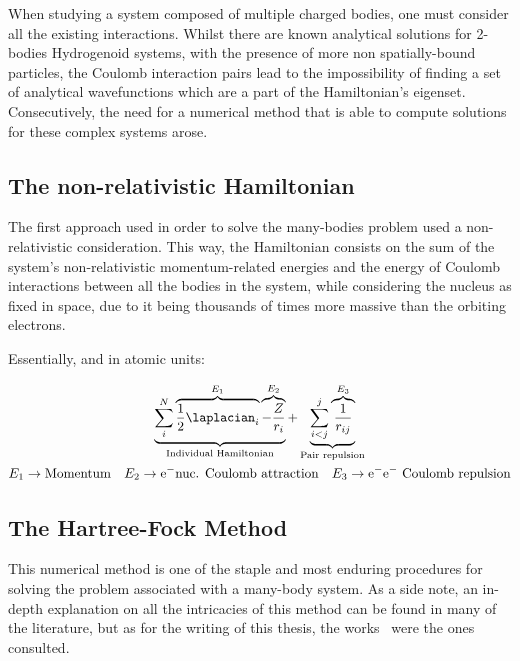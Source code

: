 When studying a system composed of multiple charged bodies, one must consider all the existing interactions. Whilst there are known analytical solutions for 2-bodies Hydrogenoid systems, with the presence of more non spatially-bound particles, the Coulomb interaction pairs lead to the impossibility of finding a set of analytical wavefunctions which are a part of the Hamiltonian's eigenset. Consecutively, the need for a numerical method that is able to compute solutions for these complex systems arose.

\subsection{The non-relativistic Hamiltonian}

The first approach used in order to solve the many-bodies problem used a non-relativistic consideration. This way, the Hamiltonian consists on the sum of the system's non-relativistic momentum-related energies and the energy of Coulomb interactions between all the bodies in the system, while considering the nucleus as fixed in space, due to it being thousands of times more massive than the orbiting electrons.

Essentially, and in atomic units:




\begin{equation}
    \begin{gathered}
        \underbrace{\sum_i^N \overbrace{ \dfrac{1}{2}\laplacian_i}^{E_1}  \overbrace{-\frac{Z}{r_i}}^{E_2}}_{\text{Individual Hamiltonian}}  + \underbrace{\sum_{i<j}^{j}\overbrace{\dfrac{1}{r_{ij}}}^{E_3}}_{\text{Pair repulsion}}\\
        E_1\rightarrow\text{Momentum}\quad E_2\rightarrow\text{e$^-$nuc. Coulomb attraction}\quad E_3\rightarrow\text{e$^-$e$^-$ Coulomb repulsion}
    \end{gathered}
    \label{eq:nonRelHam}
\end{equation}



\subsection{The Hartree-Fock Method}\label{sec:HF}

This numerical method is one of the staple and most enduring procedures for solving the problem associated with a many-body system. As a side note, an in-depth explanation on all the intricacies of this method can be found in many of the literature, but as for the writing of this thesis, the works~\cite{HFweb,JPS,Ramon,Blinder2018} were the ones consulted.

